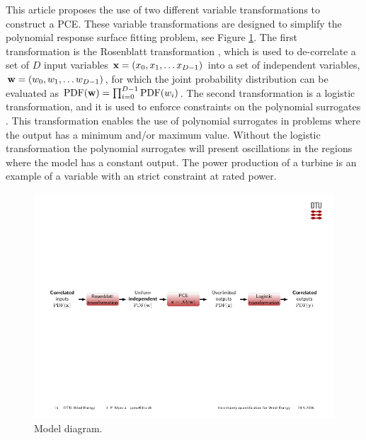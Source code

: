 \documentclass[preprint,12pt]{elsarticle}
\begin{document}
This article proposes the use of two different variable transformations to construct a PCE. These variable transformations are designed to simplify the polynomial response surface fitting problem, see Figure \ref{fig_2_trans}. The first transformation is the Rosenblatt transformation \cite{rosenblatt1952}, which is used to de-correlate a set of $D$ input variables $\mathbf{x} = (x_0, x_1, \ldots x_{D-1})$ into a set of independent variables, $\mathbf{w} = (w_0, w_1, \ldots w_{D-1})$, for which the joint probability distribution can be evaluated as $\mathrm{PDF}(\mathbf{w}) = \prod_{i=0}^{D-1}{\mathrm{PDF}(w_i)}$. The second transformation is a logistic transformation, and it is used to enforce constraints on the polynomial surrogates \cite{simard1998transformation}. This transformation enables the use of polynomial surrogates in problems where the output has a minimum and/or maximum value. Without the logistic transformation the polynomial surrogates will present oscillations in the regions where the model has a constant output. The power production of a turbine is an example of a variable with an strict constraint at rated power.

\begin{figure}[h!]
\begin{centering}
\includegraphics[width=\columnwidth]{Figures/2_transfromation_steps.pdf}
\caption{Model diagram.}
\label{fig_2_trans}
\end{centering}
\end{figure}

\end{document}
